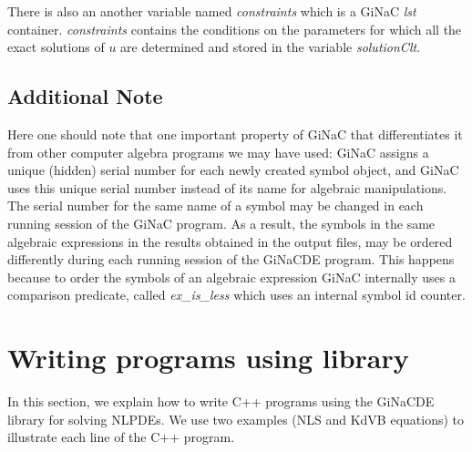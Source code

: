 \documentclass[prd,aps,floats,showkeys,nofootinbib,notitlepage]{revtex4-2}
\begin{document}
	There is also an another variable named {\em constraints} which is a GiNaC {\em lst} container. {\em constraints} contains the conditions on the parameters for which all the exact solutions of $u$ are determined and stored in the variable {\em solutionClt}.
	
	\subsection{Additional Note}
	Here one should note that one important property of GiNaC that differentiates it from other computer algebra programs we may have used: GiNaC assigns a unique (hidden) serial number for each newly created symbol object, and GiNaC uses this unique serial number instead of its name for algebraic manipulations. The serial number for the same name of a symbol may be changed in each running session of the GiNaC program. As a result, the symbols in the same algebraic expressions in the results obtained in the output files, may be ordered differently during each running session of the GiNaCDE program. This happens because to order the symbols of an algebraic expression GiNaC internally uses a comparison predicate, called {\em ex\_is\_less} which uses an internal symbol id counter.	
	\section{Writing programs using library}\label{sec:examples} 
	In this section, we explain how to write C++ programs using the GiNaCDE library for solving NLPDEs. We use two examples (NLS and KdVB equations) to illustrate each line of the C++ program.
\end{document}
